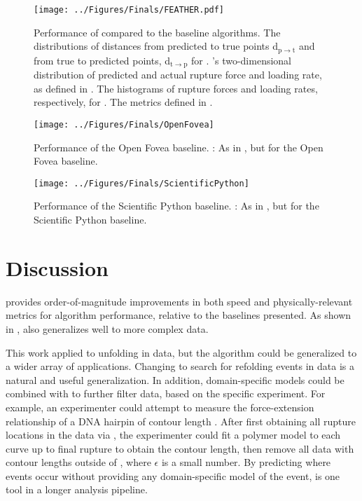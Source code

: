 \begin{figure}[htpb]
\caption[\name{} Performance]{\noindent{}Performance of \name{} compared to the baseline algorithms.  The distributions of distances from predicted to true points d$_{\mathrm{p}\rightarrow\mathrm{t}}$ and from true to predicted points, d$_{\mathrm{t}\rightarrow\mathrm{p}}$ for \name{}.  \name{}'s two-dimensional distribution of predicted and actual rupture force and loading rate, as defined in .  The histograms of rupture forces and loading rates, respectively, for \name{}.   The metrics defined in . }
\centering
\texttt{[image: ../Figures/Finals/FEATHER.pdf]}%
\end{figure}

\begin{figure}[htpb]
\caption[Open Fovea Performance]{\noindent{}Performance of the Open Fovea baseline. : As in , but for the Open Fovea baseline.}
\centering
\texttt{[image: ../Figures/Finals/OpenFovea]}%
\end{figure}



\begin{figure}[htpb]
\caption[Scientific Python Performance]{\noindent{}Performance of the Scientific Python baseline. : As in , but for the Scientific Python baseline. }
\centering
\texttt{[image: ../Figures/Finals/ScientificPython]}%
\end{figure}


\chapter{Discussion}


 \name{} provides order-of-magnitude improvements in both speed and physically-relevant metrics for algorithm performance, relative to the baselines presented. As shown in , \name{} also generalizes well to more complex \singlemol{} data.  

This work applied \name{} to unfolding in \singlemol{} data, but the algorithm could be generalized to a wider array of applications. Changing \name{} to search for refolding events in \singlemol{} data is a natural and useful generalization. In addition, domain-specific models could be combined with \name{} to further filter data, based on the specific experiment. For example, an experimenter could attempt to measure the force-extension relationship of a DNA hairpin of contour length . After first obtaining all rupture locations in the data via \name{}, the experimenter could fit a polymer model to each curve up to final rupture to obtain the contour length, then remove all data with contour lengths outside of , where $\epsilon$ is a small number. By predicting where events occur without providing any domain-specific model of the event, \name{} is one tool in a longer \singlemol{} analysis pipeline.

